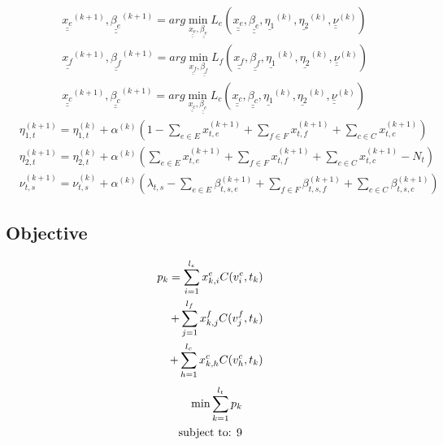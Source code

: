 \documentclass[conference]{IEEEtran}
\begin{document}
    \begin{subequations}
      \begin{align}
        & \underline{\underline {x_e}}^{(k+1)}, \underline{\underline {\beta_e}}^{(k+1)} = arg \min_{\underline{\underline {x_e}}, \underline{\underline {\beta_e}}}L_e(\underline{\underline {x_e}}, \underline{\underline {\beta_e}}, \underline {\eta_1}^{(k)}, \underline {\eta_2}^{(k)}, \underline{\underline \nu}^{(k)}) \\
        & \underline{\underline {x_f}}^{(k+1)}, \underline{\underline {\beta_f}}^{(k+1)} = arg \min_{\underline{\underline {x_f}}, \underline{\underline {\beta_f}}}L_f(\underline{\underline {x_f}}, \underline{\underline {\beta_f}}, \underline {\eta_1}^{(k)}, \underline {\eta_2}^{(k)}, \underline{\underline \nu}^{(k)}) \\
        & \underline{\underline {x_c}}^{(k+1)}, \underline{\underline {\beta_c}}^{(k+1)} = arg \min_{\underline{\underline {x_c}}, \underline{\underline {\beta_c}}}L_c(\underline{\underline {x_c}}, \underline{\underline {\beta_c}}, \underline {\eta_1}^{(k)}, \underline {\eta_2}^{(k)}, \underline{\underline \nu}^{(k)})
      \end{align}
    \end{subequations}
    \begin{subequations}
      \begin{align}
        &\eta_{1,t}^{(k+1)} = \eta_{1,t}^{(k)} + \alpha^{(k)}(1-\sum_{e \in E}x_{t,e}^{(k+1)} + \sum_{f \in F}x_{t,f}^{(k+1)} + \sum_{c \in C}x_{t,c}^{(k+1)}) \\
        &\eta_{2,t}^{(k+1)} = \eta_{2,t}^{(k)} + \alpha^{(k)}(\sum_{e \in E}x_{t,e}^{(k+1)} + \sum_{f \in F}x_{t,f}^{(k+1)} + \sum_{c \in C}x_{t,c}^{(k+1)}-N_t) \\
        &\nu_{t,s}^{(k+1)} = \nu_{t,s}^{(k)} + \alpha^{(k)}(\lambda_{t,s} - \sum_{e \in E}\beta_{t,s,e}^{(k+1)} + \sum_{f \in F}\beta_{t,s,f}^{(k+1)} +\sum_{c \in C}\beta_{t,s,c}^{(k+1)})
      \end{align}
    \end{subequations}
    \subsection{Objective}

    \begin{subequations}
        \begin{align}
          p_k = \sum_{i=1}^{l_e}x_{k,i}^e C(v_i^e, t_k) \\ \notag
          +\sum_{j=1}^{l_f}x_{k,j}^f C(v_j^f, t_k) \\ \notag
          +\sum_{h=1}^{l_c}x_{k,h}^c C(v_h^c, t_k)
        \end{align}
    \end{subequations}
    \begin{subequations}
    \begin{align}
      \min{\sum_{k=1}^{l_t}{p_k}} \\ \notag
      \text{subject to: 9}
    \end{align}
    \end{subequations}
\end{document}
